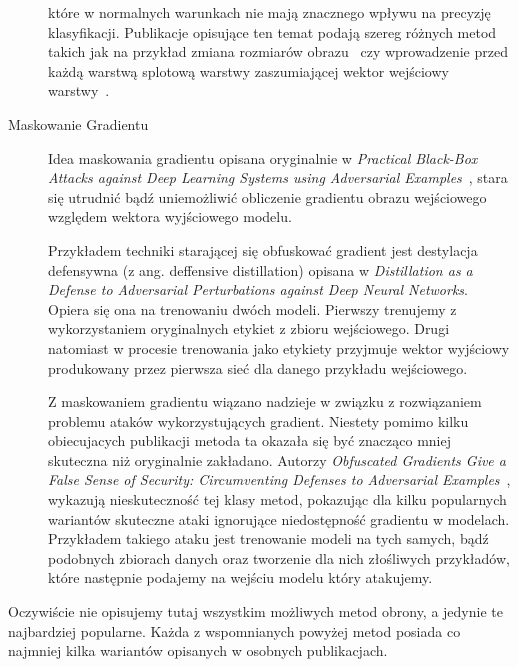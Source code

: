 \documentclass[
    left=2.5cm,         %
    right=2.5cm,        %
    top=2.5cm,          %
    bottom=3cm,         %
    bindingoffset=6mm,  %
    nohyphenation=false %
]{eiti/eiti-thesis}
\begin{document}
\begin{description}
        które w normalnych warunkach nie mają znacznego wpływu na precyzję klasyfikacji.
        Publikacje opisujące ten temat podają szereg różnych metod takich jak na przykład zmiana rozmiarów obrazu~\cite{DBLP:journals/corr/abs-1711-01991} czy
        wprowadzenie przed każdą warstwą splotową warstwy zaszumiającej wektor wejściowy warstwy~\cite{DBLP:journals/corr/abs-1712-00673}.
    \item[Maskowanie Gradientu]
        Idea maskowania gradientu opisana oryginalnie w \textit{Practical Black-Box Attacks against Deep Learning Systems using Adversarial Examples}~\cite{DBLP:journals/corr/PapernotMGJCS16},
        stara się utrudnić bądź uniemożliwić obliczenie gradientu obrazu wejściowego względem wektora wyjściowego modelu.

        Przykładem techniki starającej się obfuskować gradient jest destylacja defensywna (z ang. deffensive distillation) opisana w
        \textit{Distillation as a Defense to Adversarial Perturbations against Deep Neural Networks}\cite{DBLP:journals/corr/PapernotMWJS15}.
        Opiera się ona na trenowaniu dwóch modeli.
        Pierwszy trenujemy z wykorzystaniem oryginalnych etykiet z zbioru wejściowego.
        Drugi natomiast w procesie trenowania jako etykiety przyjmuje wektor wyjściowy produkowany przez pierwsza sieć dla danego przykładu wejściowego.

        Z maskowaniem gradientu wiązano nadzieje w związku z rozwiązaniem problemu ataków wykorzystujących gradient. Niestety pomimo kilku obiecujacych publikacji
        metoda ta okazała się być znacząco mniej skuteczna niż oryginalnie zakładano.
        Autorzy \textit{Obfuscated Gradients Give a False Sense of Security: Circumventing Defenses to Adversarial Examples}~\cite{DBLP:journals/corr/abs-1802-00420},
        wykazują nieskuteczność tej klasy metod, pokazując dla kilku popularnych wariantów skuteczne ataki ignorujące niedostępność gradientu w modelach.
        Przykładem takiego ataku jest trenowanie modeli na tych samych, bądź podobnych zbiorach danych oraz tworzenie dla nich złośliwych przykładów, które
        następnie podajemy na wejściu modelu który atakujemy.


\end{description}
Oczywiście nie opisujemy tutaj wszystkim możliwych metod obrony, a jedynie te najbardziej popularne. Każda z wspomnianych powyżej metod posiada co najmniej kilka
wariantów opisanych w osobnych publikacjach.
\newpage
\end{document}
